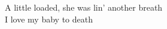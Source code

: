 \songwordfb{} A little loaded, she was lin' another breath \\
\songwordfb{} I love my baby to death \songwordfb{} \\


